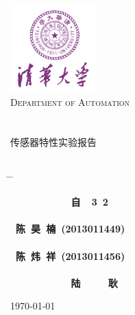 


\begin{titlepage}
\begin{center}
\includegraphics[width=0.25\textwidth]{resource/logo.jpg}\\[1cm]
\textsc{\LARGE Department of Automation}\\[1.5cm]
\\[0.5cm]
\hrulefill
\\[0.8cm]{\centering \huge \hei 传感器特性实验报告}\\[0.4cm]
\hrulefill
\\[4cm]

\begin{tabbing}       %

 \hspace*{5cm} \= \hspace{2.6cm} \= \kill

\>  {\centering\fs\sihao\textbf{~~~~~~~~~~~自~~3~2}} \\
\\
\>  {\centering\fs\sihao\textbf{~陈~昊~楠~(2013011449)}}\\
\\
\>  {\centering\fs\sihao\textbf{~陈~炜~祥~(2013011456)}}\\
\\
\>  {\centering\fs\sihao\textbf{~~~~~~~~~~~陆~~~~~耿}} \\

\end{tabbing}
\vfill
{\large \today}
\end{center}
\end{titlepage}

